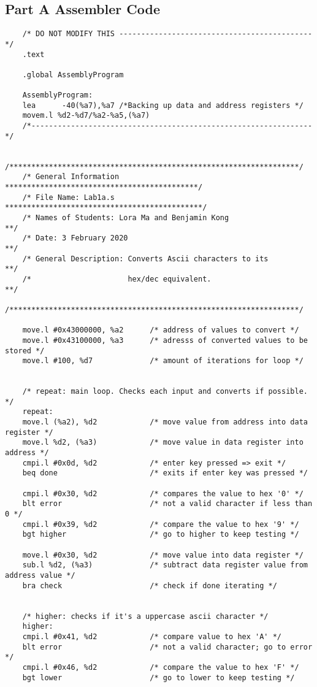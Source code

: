 \documentclass[10pt, letterpaper, titlepage]{article} %
\begin{document}
\subsection{Part A Assembler Code}
\begin{lstlisting}
	/* DO NOT MODIFY THIS --------------------------------------------*/
	.text
	
	.global AssemblyProgram
	
	AssemblyProgram:
	lea      -40(%a7),%a7 /*Backing up data and address registers */
	movem.l %d2-%d7/%a2-%a5,(%a7)
	/*----------------------------------------------------------------*/
	
	/******************************************************************/
	/* General Information ********************************************/
	/* File Name: Lab1a.s *********************************************/
	/* Names of Students: Lora Ma and Benjamin Kong                  **/
	/* Date: 3 February 2020                                         **/
	/* General Description: Converts Ascii characters to its         **/
	/*                      hex/dec equivalent.                      **/
	/******************************************************************/
	
	move.l #0x43000000, %a2      /* address of values to convert */
	move.l #0x43100000, %a3      /* adresss of converted values to be stored */
	move.l #100, %d7             /* amount of iterations for loop */
	
	
	/* repeat: main loop. Checks each input and converts if possible. */
	repeat:
	move.l (%a2), %d2            /* move value from address into data register */
	move.l %d2, (%a3)            /* move value in data register into address */
	cmpi.l #0x0d, %d2            /* enter key pressed => exit */
	beq done                     /* exits if enter key was pressed */
	
	cmpi.l #0x30, %d2            /* compares the value to hex '0' */
	blt error                    /* not a valid character if less than 0 */
	cmpi.l #0x39, %d2            /* compare the value to hex '9' */
	bgt higher                   /* go to higher to keep testing */
	
	move.l #0x30, %d2            /* move value into data register */
	sub.l %d2, (%a3)             /* subtract data register value from address value */
	bra check                    /* check if done iterating */
	
	
	/* higher: checks if it's a uppercase ascii character */
	higher:
	cmpi.l #0x41, %d2            /* compare value to hex 'A' */
	blt error                    /* not a valid character; go to error */
	cmpi.l #0x46, %d2            /* compare the value to hex 'F' */
	bgt lower                    /* go to lower to keep testing */
	  

\end{lstlisting}
\end{document}
